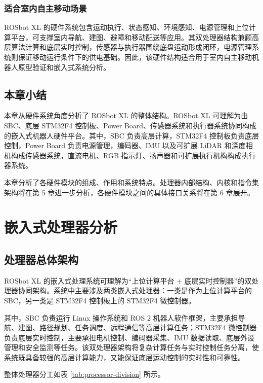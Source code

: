 \documentclass[UTF8,a4paper,12pt]{ctexrep}
\begin{document}
\subsection{适合室内自主移动场景}

ROSbot XL 的硬件系统包含运动执行、状态感知、环境感知、电源管理和上位计算平台，可支撑室内导航、建图、避障和移动配送等应用。其双处理器结构兼顾高层算法计算和底层实时控制，传感器与执行器围绕底盘运动形成闭环，电源管理系统则保证移动运行条件下的供电基础。因此，该硬件结构适合用于室内自主移动机器人原型验证和嵌入式系统分析。

\section{本章小结}

本章从硬件系统角度分析了 ROSbot XL 的整体结构。ROSbot XL 可理解为由 SBC、底层 STM32F4 控制板、Power Board、传感器系统和执行器系统协同构成的嵌入式机器人硬件平台。其中，SBC 负责高层计算，STM32F4 控制板负责底层控制，Power Board 负责电源管理，编码器、IMU 以及可扩展 LiDAR 和深度相机构成传感器系统，直流电机、RGB 指示灯、扬声器和可扩展执行机构构成执行器系统。

本章分析了各硬件模块的组成、作用和系统特点。处理器内部结构、内核和指令集架构将在第 5 章进一步分析，各硬件模块之间的具体接口关系将在第 6 章展开。

\chapter{嵌入式处理器分析}

\section{处理器总体架构}

ROSbot XL 的嵌入式处理系统可理解为“上位计算平台 + 底层实时控制器”的双处理器协同架构。系统中主要涉及两类嵌入式处理器：一类是作为上位计算平台的 SBC，另一类是 STM32F4 控制板上的 STM32F4 微控制器。

其中，SBC 负责运行 Linux 操作系统和 ROS 2 机器人软件框架，主要承担导航、建图、路径规划、任务调度、远程通信等高层计算任务；STM32F4 微控制器负责底层实时控制，主要承担电机控制、编码器采集、IMU 数据读取、底层外设管理和安全监测等任务。该双处理器架构将复杂计算任务与实时控制任务分离，使系统既具备较强的高层计算能力，又能保证底层运动控制的实时性和可靠性。

整体处理器分工如表 \ref{tab:processor-division} 所示。
\end{document}
